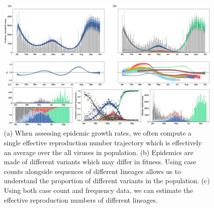 \documentclass[11pt,oneside,letterpaper]{article}
\begin{document}
\begin{figure}
  \centering
  \includegraphics[width=\linewidth]{figs/fig_1.png}
  \caption{ (a) When assessing epidemic growth rates, we often compute a single effective reproduction number trajectory which is effectively an average over the all viruses in population.
    (b) Epidemics are made of different variants which may differ in fitness. Using case counts alongside sequences of different lineages allows us to understand the proportion of different variants in the population.
(c) Using both case count and frequency data, we can estimate the effective reproduction numbers of different lineages.}%
  \label{fig:1}
\end{figure}
\end{document}
